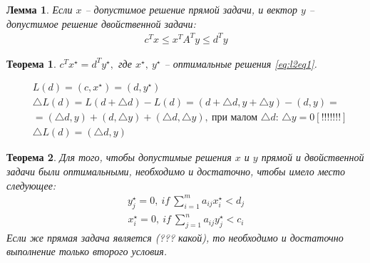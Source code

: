 \documentclass[12pt,a4paper,titlepage,oneside]{book}
\theoremstyle{definition}
\theoremstyle{plain}
\newtheorem{theorem}{Теорема}[chapter]
\theoremstyle{remark}
\theoremstyle{remark}
\theoremstyle{plain}
\newtheorem{lemma}{Лемма}[chapter]
\theoremstyle{plain}
\begin{document}
\begin{lemma}
Если $x$ -- допустимое решение прямой задачи, и вектор $y$ -- допустимое решение двойственной задачи:
\begin{align}\label{eq:l2eq1}
c^Tx \leq x^TA^Ty \leq d^Ty
\end{align}
\end{lemma}

\begin{theorem}
$c^T x^\star = d^T y^\star,$ где $x^\star, \: y^\star$ -- оптимальные решения \eqref{eq:l2eq1}.
\end{theorem}
\begin{align*}
&L(d) = (c,x^\star) = (d,y^\star)\\
&\bigtriangleup L(d) = L(d+\bigtriangleup d) - L(d) = (d+ \bigtriangleup d, y + \bigtriangleup y) - (d,y) =\\
& = (\bigtriangleup d, y) + (d, \bigtriangleup y) + (\bigtriangleup d, \bigtriangleup y), \: \text{при малом $\bigtriangleup d$: $\bigtriangleup y  = 0$}[!!!!!!!]\\
&\bigtriangleup L(d) = (\bigtriangleup d, y)
\end{align*}
\begin{theorem}
Для того, чтобы допустимые решения $x$ и $y$ прямой и двойственной задачи были оптимальными, необходимо и достаточно, чтобы имело место следующее:
\begin{align}\label{eq:t1fory}
y_j^\star = 0,\: if \: \sum\limits_{i=1}^m a_{ij}x_i^\star < d_j
\end{align}
\begin{align}\label{eq:t1forx}
x_i^\star = 0,\: if \: \sum\limits_{j=1}^n a_{ij}y_j^\star < c_i
\end{align}
Если же прямая задача является (??? какой), то необходимо и достаточно выполнение только второго условия.
\end{theorem}
\end{document}
